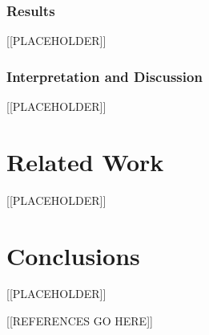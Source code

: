 \documentclass{article}
\begin{document}
\subsubsection{\textbf{Results}}

[[PLACEHOLDER]]

\subsubsection{\textbf{Interpretation and Discussion}}

[[PLACEHOLDER]]

\section{Related Work}

[[PLACEHOLDER]]

\section{Conclusions}
\label{sec:conclusions}

[[PLACEHOLDER]]

[[REFERENCES GO HERE]]

%
%
\end{document}
